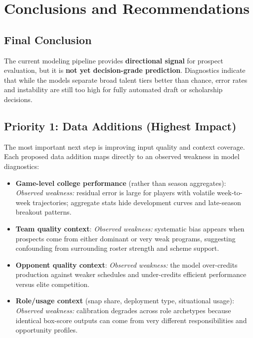 \section{Conclusions and Recommendations}

\subsection{Final Conclusion}
The current modeling pipeline provides \textbf{directional signal} for prospect evaluation, but it is \textbf{not yet decision-grade prediction}. Diagnostics indicate that while the models separate broad talent tiers better than chance, error rates and instability are still too high for fully automated draft or scholarship decisions.

\subsection{Priority 1: Data Additions (Highest Impact)}
The most important next step is improving input quality and context coverage. Each proposed data addition maps directly to an observed weakness in model diagnostics:

\begin{itemize}
    \item \textbf{Game-level college performance} (rather than season aggregates):
    \emph{Observed weakness:} residual error is large for players with volatile week-to-week trajectories; aggregate stats hide development curves and late-season breakout patterns.

    \item \textbf{Team quality context}:
    \emph{Observed weakness:} systematic bias appears when prospects come from either dominant or very weak programs, suggesting confounding from surrounding roster strength and scheme support.

    \item \textbf{Opponent quality context}:
    \emph{Observed weakness:} the model over-credits production against weaker schedules and under-credits efficient performance versus elite competition.

    \item \textbf{Role/usage context} (snap share, deployment type, situational usage):
    \emph{Observed weakness:} calibration degrades across role archetypes because identical box-score outputs can come from very different responsibilities and opportunity profiles.
\end{itemize}

